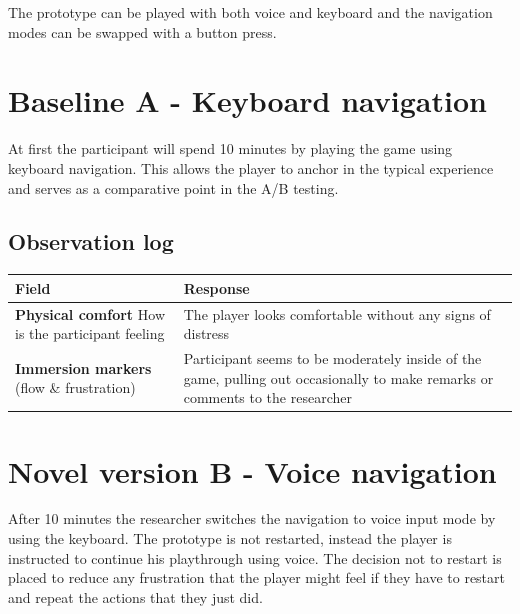 The prototype can be played with both voice and keyboard and the navigation modes can be swapped with a button press. 

\section{Baseline A - Keyboard navigation}
At first the participant will spend 10 minutes by playing the game using keyboard navigation.
This allows the player to anchor in the typical experience and serves as a comparative point in the A/B testing.

\subsection{Observation log}
\begin{table}[h]
\centering
\begin{tabular}{|p{5cm}|p{10cm}|}
\hline
\textbf{Field} & \textbf{Response} \\ \hline
\textbf{Physical comfort} How is the participant feeling & The player looks comfortable without any signs of distress \\[1.5cm] \hline
\textbf{Immersion markers} (flow \& frustration) & Participant seems to be moderately inside of the game, pulling out occasionally to make remarks or comments to the researcher\\[1.5cm] \hline
\end{tabular}
\end{table}

\section{Novel version B - Voice navigation}
After 10 minutes the researcher switches the navigation to voice input mode by using the keyboard. The prototype is not restarted,
instead the player is instructed to continue his playthrough using voice. The decision not to restart is placed to reduce any frustration that the player
might feel if they have to restart and repeat the actions that they just did.

